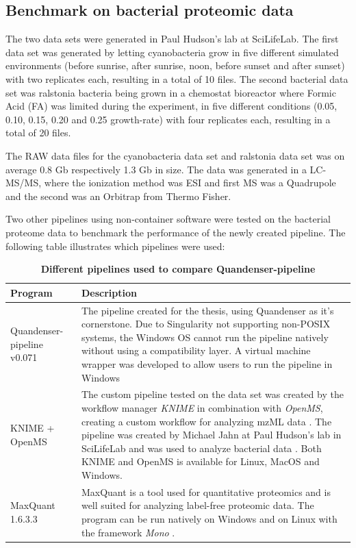 \subsection{Benchmark on bacterial proteomic data}
The two data sets were generated in Paul Hudson's lab at SciLifeLab. The first data set was generated by letting cyanobacteria grow in five different simulated environments (before sunrise, after sunrise, noon, before sunset and after sunset) with two replicates each, resulting in a total of 10 files. The second bacterial data set was ralstonia bacteria being grown in a chemostat bioreactor where Formic Acid (FA) was limited during the experiment, in five different conditions (0.05, 0.10, 0.15, 0.20 and 0.25 growth-rate) with four replicates each, resulting in a total of 20 files.

The RAW data files for the cyanobacteria data set and ralstonia data set was on average 0.8 Gb respectively 1.3 Gb in size. The data was generated in a LC-MS/MS, where the ionization method was ESI and first MS was a Quadrupole and the second was an Orbitrap from Thermo Fisher.

Two other pipelines using non-container software were tested on the bacterial proteome data to benchmark the performance of the newly created pipeline. The following table illustrates which pipelines were used:

\newcommand{\textone}{\small The pipeline created for the thesis, using Quandenser as it's cornerstone. Due to Singularity not supporting non-POSIX systems, the Windows OS cannot run the pipeline natively without using a compatibility layer. A virtual machine wrapper was developed to allow users to run the pipeline in Windows}
\newcommand{\texttwo}{\small The custom pipeline tested on the data set was created by the workflow manager \textit{KNIME} in combination with \textit{OpenMS}, creating a custom workflow for analyzing mzML data \cite{openms, knime}. The pipeline was created by Michael Jahn at Paul Hudson's lab in SciLifeLab and was used to analyze bacterial data \cite{m-jahn-pipeline}. Both KNIME and OpenMS is available for Linux, MacOS and Windows.}
\newcommand{\textthree}{\small MaxQuant is a tool used for quantitative proteomics and is well suited for analyzing label-free proteomic data. The program can be run natively on Windows and on Linux with the framework \textit{Mono} \cite{maxquant, maxquant-installation}.}

\begin{table}[H]
\caption{\textbf{Different pipelines used to compare Quandenser-pipeline}}
\begin{center}
\begin{tabular}{|p{4cm}|p{9cm}|}
\hline
Program & Description \\ \hline \hline
Quandenser-pipeline v0.071 & \textone \\ \hline
KNIME + OpenMS & \texttwo \\ \hline
MaxQuant 1.6.3.3 & \textthree \\ \hline
\end{tabular}
\end{center}
\end{table}

